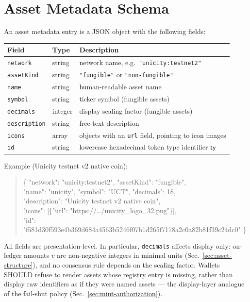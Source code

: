 \section{Asset Metadata Schema}\label{app:asset-metadata}

An asset metadata entry is a JSON object with the following fields:

\begin{longtable}{llp{7.6cm}}
\textbf{Field} & \textbf{Type} & \textbf{Description} \\
\hline
\endhead
\texttt{network} & string & network name, e.g.\ \texttt{"unicity:testnet2"} \\
\texttt{assetKind} & string & \texttt{"fungible"} or \texttt{"non-fungible"} \\
\texttt{name} & string & human-readable asset name \\
\texttt{symbol} & string & ticker symbol (fungible assets) \\
\texttt{decimals} & integer & display scaling factor (fungible assets) \\
\texttt{description} & string & free-text description \\
\texttt{icons} & array & objects with an \texttt{url} field, pointing to icon images \\
\texttt{id} & string & lowercase hexadecimal token type identifier $\mathsf{ty}$ \\
\end{longtable}

Example (Unicity testnet v2 native coin):
\begin{quote}\small\ttfamily
\{ "network": "unicity:testnet2", "assetKind": "fungible",\\
\phantom{\{ }"name": "unicity", "symbol": "UCT", "decimals": 18,\\
\phantom{\{ }"description": "Unicity testnet v2 native coin",\\
\phantom{\{ }"icons": [\{"url": "https://\ldots/unicity\_logo\_32.png"\}],\\
\phantom{\{ }"id": "f581d30f593e4b369d684a4563b5246f07b1d265f7178a2c0a82b81f39c24dc0" \}
\end{quote}

All fields are presentation-level. In particular, \texttt{decimals} affects display only: on-ledger amounts $v$ are non-negative integers in minimal units (Sec.~\ref{sec:asset-structure}), and no consensus rule depends on the scaling factor. Wallets SHOULD refuse to render assets whose registry entry is missing, rather than display raw identifiers as if they were named assets --- the display-layer analogue of the fail-shut policy (Sec.~\ref{sec:mint-authorization}).

